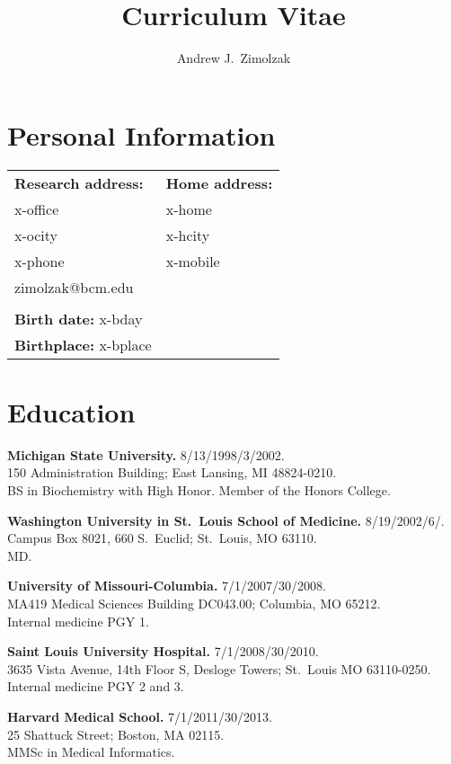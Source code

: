 \documentclass[10pt]{article}
\title{Curriculum Vitae}
\author{Andrew J.\ Zimolzak}
\begin{document}
\thispagestyle{fancy}

\section*{Personal Information}

\begin{tabular}{l l}
\textbf{Research address:}  & \textbf{Home address:}\\
x-office    & x-home\\
x-ocity    & x-hcity\\
x-phone    & x-mobile\\
zimolzak@bcm.edu\\
\\
\textbf{Birth date:} x-bday\\
\textbf{Birthplace:} x-bplace
\end{tabular}




\section*{Education}

\textbf{Michigan State University.} 8/13/1998/3/2002.\\
150 Administration Building; East Lansing, MI 48824-0210.\\
BS in Biochemistry with High Honor. Member of the Honors College.

\textbf{Washington University in St.\ Louis School of Medicine.}
8/19/2002\ndash{}/6/.\\
Campus Box 8021, 660 S.\ Euclid; St.\ Louis, MO 63110.\\
MD.

\textbf{University of Missouri-Columbia.} 7/1/2007/30/2008.\\
MA419 Medical Sciences Building DC043.00; Columbia, MO 65212.\\
Internal medicine PGY 1.

\textbf{Saint Louis University Hospital.} 7/1/2008/30/2010.\\
3635 Vista Avenue, 14th Floor S, Desloge Towers; St.\ Louis MO
63110-0250.\\
Internal medicine PGY 2 and 3.

\textbf{Harvard Medical School.} 7/1/2011/30/2013.\\
25 Shattuck Street; Boston, MA 02115.\\
MMSc in Medical Informatics.
\end{document}
